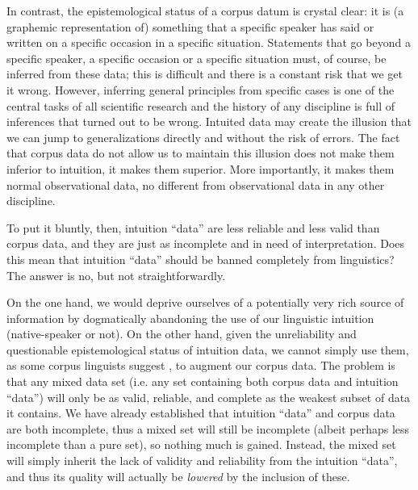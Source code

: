 In contrast, the epistemological  status of a corpus datum is crystal clear: it is (a graphemic representation of) something that a specific speaker has said or written on a specific occasion in a specific situation. Statements that go beyond a specific speaker, a specific occasion or a specific situation must, of course, be inferred from these data; this is difficult and there is a constant risk that we get it wrong. However, inferring general principles from specific cases is one of the central tasks of all scientific research and the history of any discipline is full of inferences that turned out to be wrong. Intuited  data may create the illusion that we can jump to generalizations directly and without the risk of errors. The fact that corpus data do not allow us to maintain this illusion does not make them inferior to intuition, it makes them superior. More importantly, it makes them normal observational  data, no different from observational data in any other discipline.

To put it bluntly, then, intuition  ``data'' are less reliable  and less valid  than corpus data, and they are just as incomplete and in need of interpretation. Does this mean that intuition  ``data'' should be banned completely from linguistics? The answer is no, but not straightforwardly.

On the one hand, we would deprive ourselves of a potentially very rich source of information by dogmatically abandoning the use of our linguistic intuition  (native\hyp{}speaker or not). On the other hand, given the unreliability and questionable epistemological  status of intuition data, we cannot simply use them, as some corpus linguists suggest \citep[e.g.][19]{mcenery_corpus_2001}, to augment our corpus data. The problem is that any mixed data set (i.e. any set containing both corpus data and intuition  ``data'') will only be as valid,  reliable,  and complete as the weakest subset of data it contains. We have already established that intuition ``data'' and corpus data are both incomplete, thus a mixed set will still be incomplete (albeit perhaps less incomplete than a pure set), so nothing much is gained. Instead, the mixed set will simply inherit the lack of validity and reliability from the intuition  ``data'', and thus its quality will actually be \emph{lowered} by the inclusion of these.

